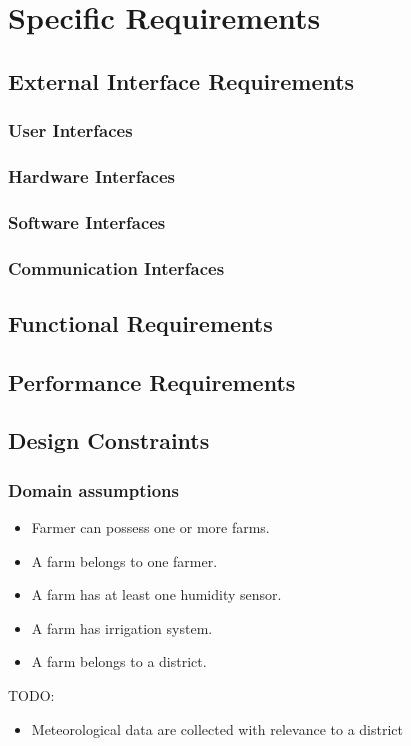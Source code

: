 \chapter{Specific Requirements}

\section{External Interface Requirements}

\subsection{User Interfaces}

\subsection{Hardware Interfaces}

\subsection{Software Interfaces}

\subsection{Communication Interfaces}

\section{Functional Requirements}

\section{Performance Requirements}

\section{Design Constraints}
\subsection{Domain assumptions}
\begin{itemize}
    \item Farmer can possess one or more farms.
    \item A farm belongs to one farmer.
    \item A farm has at least one humidity sensor.
    \item A farm has irrigation system.
    \item A farm belongs to a district.
\end{itemize}
TODO:
\begin{itemize}
    \item Meteorological data are collected with relevance to a district
\end{itemize}
